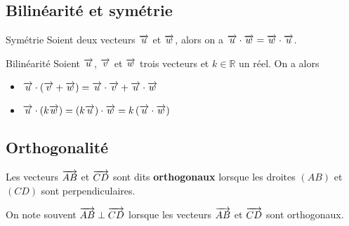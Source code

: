 \documentclass[11pt]{article}
\begin{document}
\subsection{Bilinéarité et symétrie}
\begin{propnom}{Symétrie}
  Soient deux vecteurs $\overrightarrow{u}$ et $\overrightarrow{w}$, alors on a $\overrightarrow{u}\cdot\overrightarrow{w} =
  \overrightarrow{w}\cdot\overrightarrow{u}$.
\end{propnom}
\begin{propnom}{Bilinéarité}
  Soient $\overrightarrow{u}$, $\overrightarrow{v}$ et $\overrightarrow{w}$ trois vecteurs et $k\in\mathbb{R}$ un
  réel. On a alors
  \begin{itemize}
    \item $\overrightarrow{u}\cdot\left( \overrightarrow{v}+\overrightarrow{w} \right)=\overrightarrow{u}\cdot\overrightarrow{v}+\overrightarrow{u}\cdot\overrightarrow{w}$
    \item $\overrightarrow{u}\cdot\left( k\overrightarrow{w} \right) = \left( k\overrightarrow{u}
      \right)\cdot\overrightarrow{w}=k\left( \overrightarrow{u}\cdot\overrightarrow{w} \right)$
  \end{itemize}
\end{propnom}

\subsection{Orthogonalité}
\begin{defi}
  Les vecteurs $\overrightarrow{AB}$ et $\overrightarrow{CD}$ sont dits \textbf{orthogonaux} lorsque
  les droites $(AB)$ et $(CD)$ sont perpendiculaires.
\end{defi}
\begin{notation}
  On note souvent $\overrightarrow{AB}\perp\overrightarrow{CD}$ lorsque les vecteurs
  $\overrightarrow{AB}$ et $\overrightarrow{CD}$ sont orthogonaux.
\end{notation}
\end{document}
